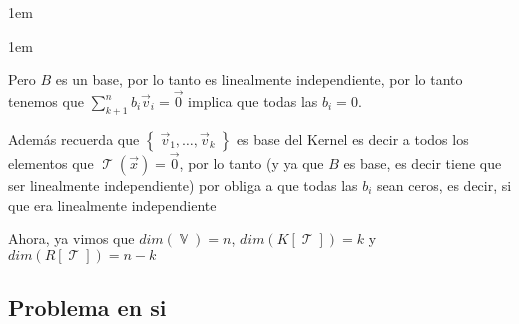 \documentclass[12pt, fleqn]{article}                             %
\newenvironment{SmallIndentation}[1][0.75em]                    %
        {\begin{adjustwidth}{#1}{}\begin{footnotesize}}             %
        {\end{footnotesize}\end{adjustwidth}}                       %
\theoremstyle{break}                                            %
\DeclareMathOperator \VectorSet    {\mathbb{V}}                 %
\DeclareMathOperator \LinTrans {\mathcal{T}}                    %
\newcommand{\Set}[1]    {\left\{ \; #1 \; \right\}}             %
\begin{document}
\begin{itemize}
\begin{SmallIndentation}[1em]
\begin{itemize}
\begin{SmallIndentation}[1em]
                                Pero $B$ es un base, por lo tanto es linealmente independiente, por
                                lo tanto tenemos que $\sum_{k+1}^n b_i \vec v_i = \vec 0$ implica que
                                todas las $b_i = 0$.

                                Además recuerda que $\Set{\vec v_1, \dots, \vec v_k}$ es base del Kernel
                                es decir a todos los elementos que $\LinTrans(\vec x) = \vec 0$, por 
                                lo tanto (y ya que $B$ es base, es decir tiene que ser linealmente independiente)
                                por obliga a que todas las $b_i$ sean ceros, es decir, si que era linealmente
                                independiente
                            
                            \end{SmallIndentation}


                            Ahora, ya vimos que $dim(\VectorSet) = n$, $dim(K[\LinTrans]) = k$
                            y $dim(R[\LinTrans]) = n - k$
                                
                    \end{itemize}
                
                \end{SmallIndentation}
        \end{itemize}

    \clearpage
    \subsection{Problema en si}
        
\end{document}
